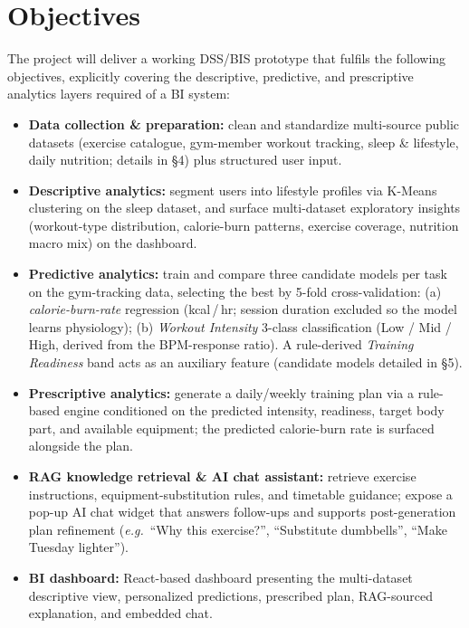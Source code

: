\documentclass[10pt,a4paper]{article}
\begin{document}
\section{Objectives}
The project will deliver a working DSS/BIS prototype that fulfils the following objectives, explicitly covering the descriptive, predictive, and prescriptive analytics layers required of a BI system:
\begin{itemize}
  \item \textbf{Data collection \& preparation:} clean and standardize multi-source public datasets (exercise catalogue, gym-member workout tracking, sleep \& lifestyle, daily nutrition; details in \S4) plus structured user input.
  \item \textbf{Descriptive analytics:} segment users into lifestyle profiles via K-Means clustering on the sleep dataset, and surface multi-dataset exploratory insights (workout-type distribution, calorie-burn patterns, exercise coverage, nutrition macro mix) on the dashboard.
  \item \textbf{Predictive analytics:} train and compare three candidate models per task on the gym-tracking data, selecting the best by 5-fold cross-validation: (a) \emph{calorie-burn-rate} regression (kcal\,/\,hr; session duration excluded so the model learns physiology); (b) \emph{Workout Intensity} 3-class classification (Low / Mid / High, derived from the BPM-response ratio). A rule-derived \emph{Training Readiness} band acts as an auxiliary feature (candidate models detailed in \S5).
  \item \textbf{Prescriptive analytics:} generate a daily/weekly training plan via a rule-based engine conditioned on the predicted intensity, readiness, target body part, and available equipment; the predicted calorie-burn rate is surfaced alongside the plan.
  \item \textbf{RAG knowledge retrieval \& AI chat assistant:} retrieve exercise instructions, equipment-substitution rules, and timetable guidance; expose a pop-up AI chat widget that answers follow-ups and supports post-generation plan refinement (\emph{e.g.}\ ``Why this exercise?'', ``Substitute dumbbells'', ``Make Tuesday lighter'').
  \item \textbf{BI dashboard:} React-based dashboard presenting the multi-dataset descriptive view, personalized predictions, prescribed plan, RAG-sourced explanation, and embedded chat.
\end{itemize}

\end{document}
